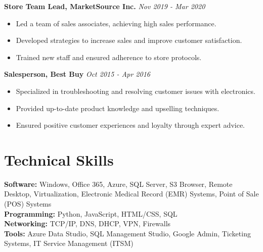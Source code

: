 \documentclass[a4paper,10pt]{article}
\begin{document}
\noindent \textbf{Store Team Lead, MarketSource Inc.} \hfill \textit{Nov 2019 - Mar 2020} \\
\begin{itemize}
    \item Led a team of sales associates, achieving high sales performance.
    \item Developed strategies to increase sales and improve customer satisfaction.
    \item Trained new staff and ensured adherence to store protocols.
\end{itemize}

\noindent \textbf{Salesperson, Best Buy} \hfill \textit{Oct 2015 - Apr 2016} \\
\begin{itemize}
    \item Specialized in troubleshooting and resolving customer issues with electronics.
    \item Provided up-to-date product knowledge and upselling techniques.
    \item Ensured positive customer experiences and loyalty through expert advice.
\end{itemize}

\section*{Technical Skills}
\noindent \textbf{Software:} Windows, Office 365, Azure, SQL Server, S3 Browser, Remote Desktop, Virtualization, Electronic Medical Record (EMR) Systems, Point of Sale (POS) Systems \\
\noindent \textbf{Programming:} Python, JavaScript, HTML/CSS, SQL \\
\noindent \textbf{Networking:} TCP/IP, DNS, DHCP, VPN, Firewalls \\
\noindent \textbf{Tools:} Azure Data Studio, SQL Management Studio, Google Admin, Ticketing Systems, IT Service Management (ITSM)
\end{document}
